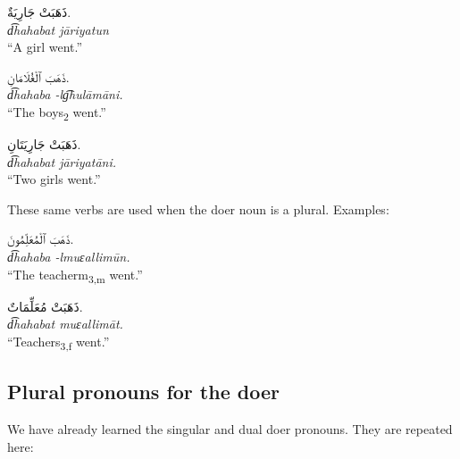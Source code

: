 \documentclass[
  10pt,
]{book}
\begin{document}
\foreignlanguage{arabic}{ذَهَبَتْ جَارِيَةٌ.}\\
\emph{d͡hahabat jāriyatun}\\
\enquote{A girl went.}

\foreignlanguage{arabic}{ذَهَبَ ٱلْغُلَامَانِ.}\\
\emph{d͡hahaba -lg͡hulāmāni.}\\
\enquote{The boys\textsubscript{2} went.}

\foreignlanguage{arabic}{ذَهَبَتْ جَارِيَتَانِ.}\\
\emph{d͡hahabat jāriyatāni.}\\
\enquote{Two girls went.}

These same verbs are used when the doer noun is a plural. Examples:

\foreignlanguage{arabic}{ذَهَبَ ٱلْمُعَلِّمُونَ.}\\
\emph{d͡hahaba -lmuɛallimūn.}\\
\enquote{The teacherm\textsubscript{3,m} went.}

\foreignlanguage{arabic}{ذَهَبَتْ مُعَلِّمَاتٌ.}\\
\emph{d͡hahabat muɛallimāt.}\\
\enquote{Teachers\textsubscript{3,f} went.}

\subsection{Plural pronouns for the doer}\label{plural-pronouns-for-the-doer}

We have already learned the singular and dual doer pronouns. They are repeated here:
\end{document}
